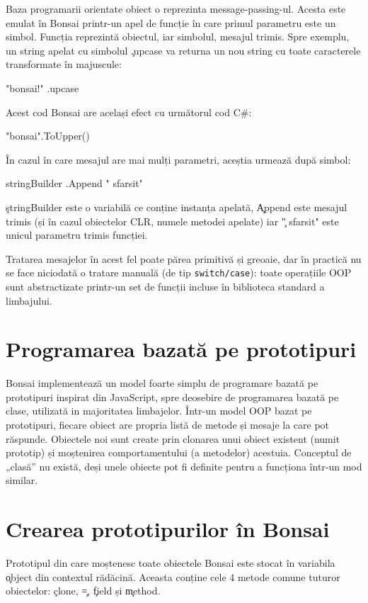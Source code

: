 \documentclass[12pt,a4paper]{memoir}
\begin{document}
Baza programarii orientate obiect o reprezinta message-passing-ul. Acesta este emulat în Bonsai printr-un apel de funcție în care primul parametru este un simbol. Funcția reprezintă obiectul, iar simbolul, mesajul trimis. Spre exemplu, un string apelat cu simbolul \c{.upcase} va returna un nou string cu toate caracterele transformate în majuscule:
\begin{code}
"bonsai!" .upcase
\end{code}
Acest cod Bonsai are același efect cu următorul cod C\#:
\begin{code}
"bonsai".ToUpper()
\end{code}
În cazul în care mesajul are mai mulți parametri, aceștia urmează după simbol:
\begin{code}
stringBuilder .Append " sfarsit"
\end{code}
\c{stringBuilder} este o variabilă ce conține instanța apelată, \c{Append} este mesajul trimis (și în cazul obiectelor CLR, numele metodei apelate) iar \c{" sfarsit"} este unicul parametru trimis funcției.

Tratarea mesajelor în acest fel poate părea primitivă și greoaie, dar în practică nu se face niciodată o tratare manuală (de tip \texttt{switch/case}): toate operațiile OOP sunt abstractizate printr-un set de funcții incluse în biblioteca standard a limbajului.

\section{Programarea bazată pe prototipuri}

Bonsai implementează un model foarte simplu de programare bazată pe prototipuri\cite{prototype_based_programming} inspirat din JavaScript, spre deosebire de programarea bazată pe clase, utilizată in majoritatea limbajelor. Într-un model OOP bazat pe prototipuri, fiecare obiect are propria listă de metode și mesaje la care pot răspunde. Obiectele noi sunt create prin clonarea unui obiect existent (numit prototip) și moștenirea comportamentului (a metodelor) acestuia. Conceptul de „clasă” nu există, deși unele obiecte pot fi definite pentru a funcționa într-un mod similar. 

\section{Crearea prototipurilor în Bonsai}

Prototipul din care moștenesc toate obiectele Bonsai este stocat în variabila \c{object} din contextul rădăcină. Aceasta conține cele 4 metode comune tuturor obiectelor: \c{clone}, \c{=}, \c{field} și \c{method}.
\end{document}
